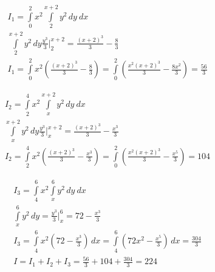 \documentclass[a4paper,fleqn,12pt]{article}
\theoremstyle{definition}
\begin{document}
\begin{gather*}
I_1 = \int\limits_0 ^2 x^2 \int\limits_{2} ^{x+2} y^2\, dy \ dx\\
\int\limits_{2} ^{x+2} y^2\, dy  \frac{y^3}{3} \Big|_{2} ^{x+2} = \frac{(x+2)^3}{3} - \frac{8}{3}\\
I_1 = \int\limits_0 ^2 x^2 \left(\frac{(x+2)^3}{3} - \frac{8}{3} \right) =  
\int\limits_0 ^2 \left(\frac{x^2(x+2)^3}{3} - \frac{8x^2}{3} \right) = \frac{56}{3} 
\end{gather*}

\begin{gather*}
I_2 = \int\limits_2 ^4 x^2 \int\limits_{x} ^{x+2} y^2 \, dy\ dx \\
\int\limits_{x} ^{x+2} y^2\, dy  \frac{y^3}{3} \Big|_{x} ^{x+2} = \frac{(x+2)^3}{3} - \frac{x^3}{3}\\
I_2 = \int\limits_2 ^4 x^2 \left(\frac{(x+2)^3}{3} - \frac{x^3}{3} \right) =  
\int\limits_0 ^2 \left(\frac{x^2(x+2)^3}{3} - \frac{x^5}{3} \right) = 104 
\end{gather*}

\begin{gather*}
I_3 = \int\limits_4 ^6 x^2 \int\limits_{x} ^{6} y^2\, dy \ dx \\
\int\limits_{x} ^{6} y^2\, dy = \frac{y^3}{3} \Big|_{x} ^{6} = 72 - \frac{x^3}{3} \\
I_3 = \int\limits_4 ^6 x^2 \left( 72 - \frac{x^3}{3}\right) \, dx =  
\int\limits_4 ^6 \left( 72x^2 - \frac{x^5}{3}\right) \, dx = \frac{304}{3} \\
I = I_1 + I_2 + I_3 = \frac{56}{3} + 104 + \frac{304}{3} = 224
\end{gather*}
\end{document}
